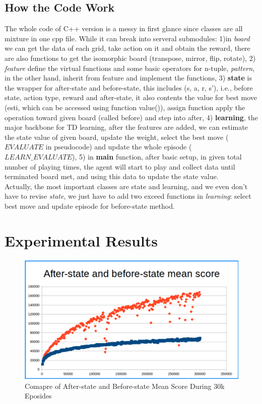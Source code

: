\documentclass[12pt,a4paper]{article}
\begin{document}
\subsection{How the Code Work}
The whole code of C++ version is a messy in first glance since classes are all mixture in one cpp file. While it can break into serveral submodules: 1)in \textit{board} we can get the data of each grid, take action on it and obtain the reward, there are also functions to get the isomorphic board (transpose, mirror, flip, rotate), 2) \textit{feature} define the virtual functions and some basic operators for n-tuple, \textit{pattern}, in the other hand, inherit from feature and implement the functions, 3) \textbf{state} is the wrapper for after-state and before-state, this includes (s, a, r, s'), i.e., before state, action type, reward and after-state, it also contents the value for best move (esti, which can be accessed using function value()), assign function apply the operation toward given board (called before) and step into after, 4) \textbf{learning}, the major backbone for TD learning, after the features are added, we can estimate the state value of given board, update the weight, select the best move ($EVALUATE$ in pseudocode) and update the whole episode ($LEARN\_EVALUATE$), 5) in \textbf{main} function, after basic setup, in given total number of playing times, the agent will start to play and collect data until terminated board met, and using this data to update the state value. \\
Actually, the most important classes are state and learning, and we even don't have to revise \textit{state}, we just have to add two exceed functions in \textit{learning}: select best move and update episode for before-state method.

\section{Experimental Results} \label{sec:res}

\begin{figure}[hbt]
\centering
\includegraphics[scale=0.3]{mean_compare.png}
\caption{Comapre of After-state and Before-state Mean Score During 30k Eposides}
\label{fig:compare_mean}
\end{figure}
\end{document}
